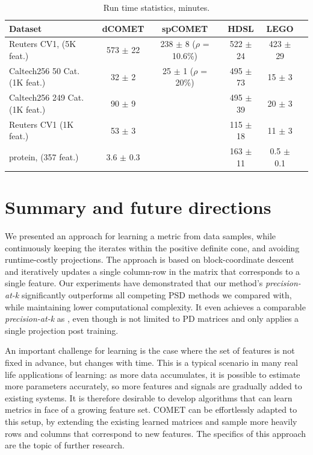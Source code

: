 \documentclass[twoside,11pt]{article}
\begin{document}
\begin{table}[t]
\captionsetup{font=small}
\caption{Run time statistics, minutes.}
\label{runtimes}
\vskip 0.15in
\begin{center}
\begin{small}
\begin{sc}
\begin{tabular}{lccccr}
\hline
Dataset     & dCOMET           & spCOMET            & HDSL             & LEGO            \\ 
\hline
Reuters CV1, (5K feat.)&  573 $\pm$    22 &   238 $\pm$    8 ($\rho$ = 10.6\%) &522 $\pm$    24 &   423 $\pm$    29 & \\ 
Caltech256 50 Cat. (1K feat.)  &    32 $\pm$     2 &        25 $\pm$  1 ($\rho$ = 20\%)     &   495 $\pm$    73 &     15 $\pm$     3 &\\ 
Caltech256 249 Cat. (1K feat.) &   90 $\pm$     9 &                  &  495 $\pm$    39  &     20 $\pm$     3 &\\
Reuters CV1 (1K feat.) &   53 $\pm$     3 &                  &   115 $\pm$    18 &     11 $\pm$     3 &\\ 
protein, (357 feat.)  &    3.6 $\pm$     0.3 &                  &   163 $\pm$    11 &      0.5 $\pm$     0.1 &\\ 
\hline
\end{tabular}
\end{sc}
\end{small}
\end{center}
\vskip -0.1in
\end{table}

\section{Summary and future directions}
We presented an approach for learning a metric from data samples, while continuously keeping the iterates within the positive definite cone, and avoiding runtime-costly projections. The approach is based on block-coordinate descent and iteratively updates a single column-row in the matrix that corresponds to a single feature. Our experiments have demonstrated that our method's \textit{precision-at-k} significantly outperforms all competing PSD methods we compared with, while maintaining lower computational complexity. It even achieves a comparable \textit{precision-at-k} as \citep{OASIS}, even though \citep{OASIS} is not limited to PD matrices and only applies a single projection post training.

An important challenge for learning is the case where the set of features is not fixed in advance, but changes with time. This is a typical scenario in many real life applications of learning: as more data accumulates, it is possible to estimate more parameters accurately, so more features and signals are gradually added to existing systems. It is therefore desirable to develop algorithms that can learn metrics in face of a growing feature set. COMET can be effortlessly adapted to this setup, by extending the existing learned matrices and sample more heavily rows and columns that correspond to new features. The specifics of this approach are the topic of further research.
\end{document}
